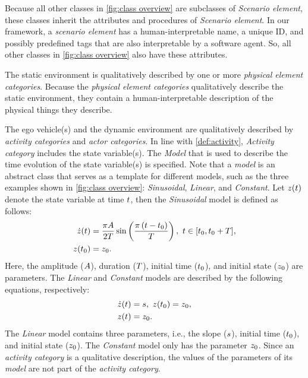 \cstartb Because all other classes in \cref{fig:class overview} are subclasses of \textit{Scenario element}, these classes inherit the attributes and procedures of \textit{Scenario element}. In our framework, a \textit{scenario element} has a human-interpretable name, a unique ID, and possibly predefined tags that are also interpretable by a software agent. So, all other classes in \cref{fig:class overview} also have these attributes. \cendb

The static environment is qualitatively described by \cstarte one or more \textit{physical element categories}. \cende
Because the \cstarte\textit{physical element categories} \cende qualitatively describe the static environment, they contain a human-interpretable description of the \cstartc physical things they describe\cendc.

The ego vehicle\cstartd(s) \cendd and the dynamic environment are qualitatively described by \textit{activity categories} and \textit{actor categories}. 
In line with \cref{def:activity}, \textit{Activity category} includes the state variable(s).
The \textit{Model} that is used to describe the time evolution of the state variable(s) is specified. 
\cstarte Note that a \textit{model} is an abstract class that serves as a template for different models, such as the three examples shown in \cref{fig:class overview}: \textit{Sinusoidal}, \textit{Linear}, and \textit{Constant}. 
Let $z(t)$ denote the state variable at time $t$, then the \textit{Sinusoidal} model is defined as follows:
\begin{align}
	\statedot(\time) &= \frac{\pi \amplitude}{2\duration} \sin \left( \frac{\pi \left( \time - \timeinit\right)}{\duration} \right),\ \time \in [\timeinit, \timeinit+\duration], \label{eq:sinusoidala} \\
	\state(\timeinit) &= \stateinit. \label{eq:sinusoidalb}
\end{align}
Here, the amplitude ($A$), duration ($T$), initial time ($t_{0}$), and initial state ($z_{0}$) are parameters. 
The \textit{Linear} and \textit{Constant} models are described by the following equations, respectively:
\begin{align}
	\statedot(\time) &= \slope,\ \state(\timeinit) = \stateinit, \label{eq:linear} \\
	\state(\time) &= \stateinit. \label{eq:constant}
\end{align}
The \textit{Linear} model contains three parameters, i.e., the slope ($s$), initial time ($t_{0}$), and initial state ($z_{0}$). The \textit{Constant} model only has the parameter $z_{0}$.
Since an \textit{activity category} is a qualitative description, the values of the parameters of its \textit{model} are not part of the \textit{activity category}. \cende

